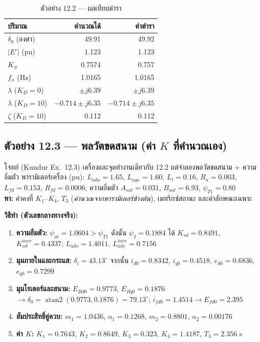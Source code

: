 \documentclass[12pt,a4paper]{article}
\begin{document}
\begin{table}[H]
\centering
\caption{ตัวอย่าง 12.2 --- ผลเทียบตำรา}
\begin{tabular}{@{}lrr@{}}
\toprule
ปริมาณ & คำนวณได้ & ค่าตำรา \\
\midrule
$\delta_0$ (องศา)      & 49.91 & 49.92 \\
$|E'|$ (pu)            & 1.123 & 1.123 \\
$K_S$                  & 0.7574 & 0.757 \\
$f_n$ (Hz)             & 1.0165 & 1.0165 \\
$\lambda$ ($K_D{=}0$)  & $\pm j6.39$ & $\pm j6.39$ \\
$\lambda$ ($K_D{=}10$) & $-0.714\pm j6.35$ & $-0.714\pm j6.35$ \\
$\zeta$ ($K_D{=}10$)   & 0.112 & 0.112 \\
\bottomrule
\end{tabular}
\end{table}

\subsection{ตัวอย่าง 12.3 --- พลวัตขดสนาม (ค่า $K$ ที่คำนวณเอง)}

\begin{keybox}{โจทย์ (Kundur Ex.\ 12.3)}
เครื่องและจุดทำงานเดียวกับ 12.2 แต่จำลองพลวัตขดสนาม + ความอิ่มตัว
พารามิเตอร์เครื่อง (pu): $L_{adu}=1.65$, $L_{aqu}=1.60$, $L_l=0.16$,
$R_a=0.003$, $L_{fd}=0.153$, $R_{fd}=0.0006$; ความอิ่มตัว $A_{sat}=0.031$,
$B_{sat}=6.93$, $\psi_{T1}=0.80$ \\
\textbf{หา:} ค่าคงที่ $K_1$--$K_4$, $T_3$ (\emph{คำนวณจากพารามิเตอร์ข้างต้น}),
เมทริกซ์สถานะ และค่าลักษณะเฉพาะ
\end{keybox}

\textbf{วิธีทำ (ตัวเลขกลางทางจริง):}
\begin{enumerate}
  \item \textbf{ความอิ่มตัว:} $\psi_{at}=1.0604 > \psi_{T1}$ ดังนั้น
        $\psi_I=0.1884$ ได้ $K_{sd}=0.8491$, $K_{sd}^{incr}=0.4337$;
        $L_{ads}=1.4011$, $L_{ads}^{incr}=0.7156$
  \item \textbf{มุมภายในและกระแส:} $\delta_i=43.13^\circ$ จากนั้น
        $i_{d0}=0.8342$, $i_{q0}=0.4518$, $e_{d0}=0.6836$, $e_{q0}=0.7299$
  \item \textbf{มุมโรเตอร์และสนาม:} $E_{Bd0}=0.9773$, $E_{Bq0}=0.1876$
        $\rightarrow \delta_0=\operatorname{atan2}(0.9773,0.1876)=79.13^\circ$;
        $i_{fd0}=1.4514 \rightarrow E_{fd0}=2.395$
  \item \textbf{สัมประสิทธิ์คู่ควบ:} $m_1=1.0436$, $n_1=0.1268$,
        $m_2=0.8801$, $n_2=0.00176$
  \item \textbf{ค่า $K$:} $K_1=0.7643$, $K_2=0.8649$, $K_3=0.323$,
        $K_4=1.4187$, $T_3=2.356$ s
\end{enumerate}
\end{document}
